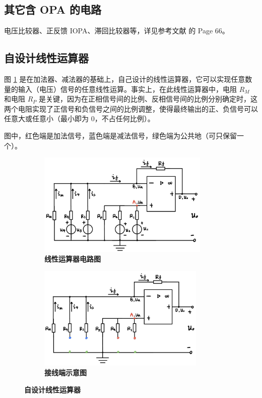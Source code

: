 \documentclass[UTF8]{report}
\theoremstyle{MyLineTheoremStyle} %
\theoremstyle{MyBlockTheoremStyle} %
\theoremstyle{MySubsubsectionStyle} %
\begin{document}
\subsection{其它含 OPA 的电路}

电压比较器、正反馈 IOPA、滞回比较器等，详见参考文献 \cite{电路原理} 的 Page 66。


\subsection{自设计线性运算器}
图 \ref{自设计线性运算器} 是在加法器、减法器的基础上，自己设计的线性运算器，它可以实现任意数量的输入（电压）信号的任意线性运算。事实上，在此线性运算器中，电阻 $R_M$ 和电阻 $R_P$ 是关键，因为在正相信号间的比例、反相信号间的比例分别确定时，这两个电阻实现了正信号和负信号之间的比例调整，使得最终输出的正、负信号可以任意大或任意小（最小即为 0，不占任何比例）。

图中，红色端是加法信号，蓝色端是减法信号，绿色端为公共地（可只保留一个）。

\begin{figure}[H]\centering
\begin{subfigure}[t]{0.49\textwidth}\centering
    \includegraphics[height=140pt]{assets/1,2/线性运算器.png}
    \caption{\bfseries 线性运算器电路图 }
\end{subfigure}\begin{subfigure}[t]{0.49\textwidth}\centering
    \includegraphics[height=140pt]{assets/1,2/线性运算器接线端.png}
    \caption{\bfseries 接线端示意图 }
\end{subfigure}
\caption{\bfseries 自设计线性运算器 }\label{自设计线性运算器}
\end{figure}
\end{document}
